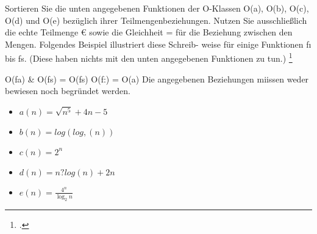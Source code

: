 \documentclass{lehramt-informatik-aufgabe}
\begin{document}

Sortieren Sie die unten angegebenen Funktionen der O-Klassen O(a), O(b),
O(c), O(d) und O(e) bezüglich ihrer Teilmengenbeziehungen. Nutzen Sie
ausschließlich die echte Teilmenge € sowie die Gleichheit = für die
Beziehung zwischen den Mengen. Folgendes Beispiel illustriert diese
Schreib- weise für einige Funktionen fı bis fs. (Diese haben nichts mit
den unten angegebenen Funktionen zu tun.)
\footcite{examen:46115:2021:03}

 O(fa) \& O(fs) = O(fs)  O(f:) = O(a)
Die angegebenen Beziehungen miissen weder bewiesen noch begründet werden.

\begin{itemize}
\item $a(n) = \sqrt{n^5} + 4n - 5$

\item $b(n) = log (log,(n))$
\item $c(n) = 2^n$

\item $d(n) = n? log(n) + 2n$

\item $e(n) = \frac{4^n}{\log_2n}$
\end{itemize}
\end{document}
